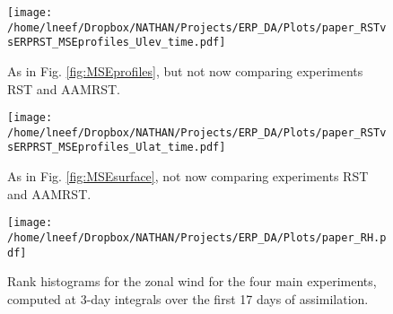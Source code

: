  \begin{figure}
 \texttt{[image: /home/lneef/Dropbox/NATHAN/Projects/ERP\_DA/Plots/paper\_RSTvsERPRST\_MSEprofiles\_Ulev\_time.pdf]}
 \caption{As in Fig. \ref{fig:MSEprofiles}, but not now comparing experiments RST and AAMRST.}
 \label{fig:MSEprofiles2}
\end{figure}

 \begin{figure}
 \texttt{[image: /home/lneef/Dropbox/NATHAN/Projects/ERP\_DA/Plots/paper\_RSTvsERPRST\_MSEprofiles\_Ulat\_time.pdf]}
 \caption{As in Fig. \ref{fig:MSEsurface}, not now comparing experiments RST and AAMRST.}
 \label{fig:MSEsurface2}
\end{figure}

\begin{figure}
	\texttt{[image: /home/lneef/Dropbox/NATHAN/Projects/ERP\_DA/Plots/paper\_RH.pdf]}
 \caption{Rank histograms for the zonal wind for the four main experiments, computed at 3-day integrals over the first 17 days of assimilation.}
 \label{fig:RHprogression}
\end{figure}


